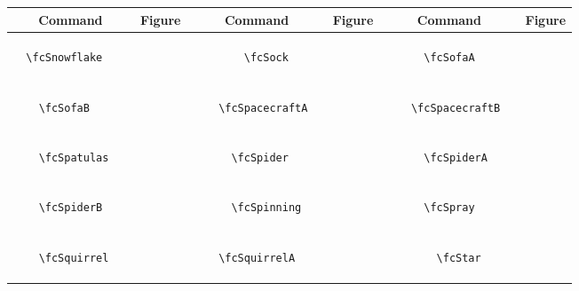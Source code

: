 \documentclass[x11names]{article}
\begin{document}
\begin{table}[H]\centering\begin{tabular}{|c|c|c|c|c|c|}\hline{\bf Command} & {\bf Figure} & {\bf Command} & {\bf Figure} & {\bf Command} & {\bf Figure}\\	\hline	&\multirow{5}{*}{	\fcSnowflake	[scale=0.16]} & &\multirow{5}{*}{	\fcSock	[scale=0.16]} & &\multirow{5}{*}{	\fcSofaA	[scale=0.09]}\\	& & & & & \\	& & & & & \\	\verb|	\fcSnowflake	| & & \verb|	\fcSock	| & & \verb|	\fcSofaA	| & \\	& & & & & \\	& & & & & \\	& & & & & \\	\hline									
		&\multirow{5}{*}{	\fcSofaB	[scale=0.09]} & &\multirow{5}{*}{	\fcSpacecraftA	[scale=0.16]} & &\multirow{5}{*}{	\fcSpacecraftB	[scale=0.16]}\\	& & & & & \\	& & & & & \\	\verb|	\fcSofaB	| & & \verb|	\fcSpacecraftA	| & & \verb|	\fcSpacecraftB	| & \\	& & & & & \\	& & & & & \\	& & & & & \\	\hline									
		&\multirow{5}{*}{	\fcSpatulas	[scale=0.16]} & &\multirow{5}{*}{	\fcSpider	[scale=0.64]} & &\multirow{5}{*}{	\fcSpiderA	[scale=0.16]}\\	& & & & & \\	& & & & & \\	\verb|	\fcSpatulas	| & & \verb|	\fcSpider	| & & \verb|	\fcSpiderA	| & \\	& & & & & \\	& & & & & \\	& & & & & \\	\hline									
		&\multirow{5}{*}{	\fcSpiderB	[scale=0.16]} & &\multirow{5}{*}{	\fcSpinning	[scale=0.64]} & &\multirow{5}{*}{	\fcSpray	[scale=0.16]}\\	& & & & & \\	& & & & & \\	\verb|	\fcSpiderB	| & & \verb|	\fcSpinning	| & & \verb|	\fcSpray	| & \\	& & & & & \\	& & & & & \\	& & & & & \\	\hline									
		&\multirow{5}{*}{	\fcSquirrel	[scale=0.64]} & &\multirow{5}{*}{	\fcSquirrelA	[scale=0.64]} & &\multirow{5}{*}{	\fcStar	[scale=0.16]}\\	& & & & & \\	& & & & & \\	\verb|	\fcSquirrel	| & & \verb|	\fcSquirrelA	| & & \verb|	\fcStar	| & \\	& & & & & \\	& & & & & \\	& & & & & \\	\hline									

\end{tabular}
\end{table}
\end{document}
